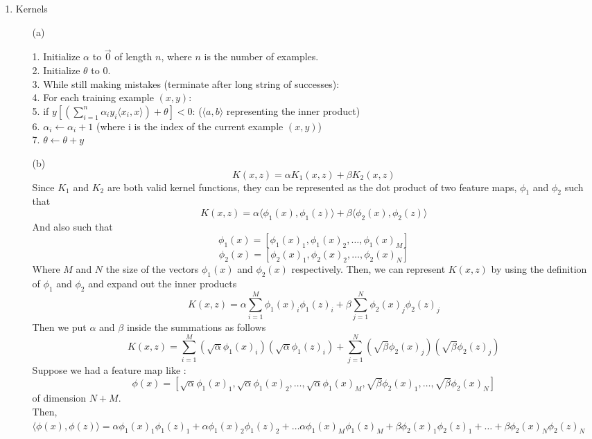 \begin{enumerate}
\begin{enumerate}
  \end{enumerate}
\item Kernels
  \begin{enumerate}
    \item[(a)]
      \begin{algorithm}
        1. Initialize $\alpha$ to $\vec{0}$ of length $n$, where $n$ is the number of examples.\\
        2. Initialize $\theta$ to $0$.\\
        3. While still making mistakes (terminate after long string of successes):\\
        4. \>\>For each training example $(x,y)$:\\
        5. \>\>\>if $y[(\sum\limits_{i=1}^n\alpha_i y_i \langle x_i, x \rangle) + \theta] < 0$: ($\langle a,b \rangle$ representing the inner product)\\
        6. \>\>\>\>$\alpha_i \leftarrow \alpha_i + 1$ (where i is the index of the current example $(x,y)$)\\
        7. \>\>\>\>$\theta \leftarrow \theta + y$\\
      \end{algorithm}
    \item[(b)]
      $$K(x,z) = \alpha K_1(x,z) + \beta K_2(x,z)$$
      Since $K_1$ and $K_2$ are both valid kernel functions, they can be represented as the dot product of two feature maps, $\phi_1$ and $\phi_2$ such that
      $$K(x,z) = \alpha \langle \phi_1(x), \phi_1(z) \rangle + \beta \langle \phi_2(x), \phi_2(z) \rangle$$
      And also such that
      $$\phi_1(x) = [\phi_1(x)_1, \phi_1(x)_2, \ldots, \phi_1(x)_M]$$
      $$\phi_2(x) = [\phi_2(x)_1, \phi_2(x)_2, \ldots, \phi_2(x)_N]$$
      Where $M$ and $N$ the size of the vectors $\phi_1(x)$ and $\phi_2(x)$ respectively.
      Then, we can represent $K(x,z)$ by using the definition of $\phi_1$ and $\phi_2$ and expand out the inner products
      $$K(x,z) = \alpha \sum\limits_{i=1}^M \phi_1(x)_i \phi_1(z)_i + \beta \sum\limits_{j=1}^N \phi_2(x)_j \phi_2(z)_j$$
      Then we put $\alpha$ and $\beta$ inside the summations as follows
      $$K(x,z) = \sum\limits_{i=1}^M (\sqrt\alpha \phi_1(x)_i) (\sqrt\alpha \phi_1(z)_i) + \sum\limits_{j=1}^N (\sqrt\beta \phi_2(x)_j) (\sqrt\beta \phi_2(z)_j)$$
      Suppose we had a feature map like :
      $$\phi(x) = [\sqrt\alpha \phi_1(x)_1, \sqrt\alpha \phi_1(x)_2, \ldots, \sqrt\alpha \phi_1(x)_M, \sqrt\beta \phi_2(x)_1, \ldots, \sqrt\beta \phi_2(x)_N]$$
      of dimension $N+M$.\\
      Then, $\langle \phi(x), \phi(z) \rangle = \alpha \phi_1(x)_1 \phi_1(z)_1 + \alpha \phi_1(x)_2 \phi_1(z)_2 + \ldots \alpha \phi_1(x)_M \phi_1(z)_M + \beta \phi_2(x)_1 \phi_2(z)_1 + \ldots + \beta \phi_2(x)_N \phi_2(z)_N$\\

\end{enumerate}
\end{enumerate}
